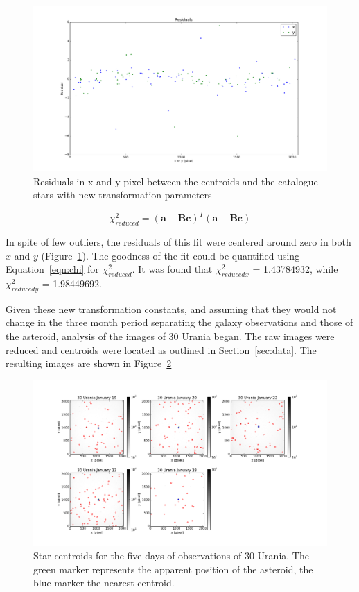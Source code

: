 \documentclass[a4paper,12pt]{article}
\begin{document}
\begin{figure}[!htbp]
\centering
\includegraphics[scale = 0.35]{fit_residuals.png}
\caption{Residuals in x and y pixel between the centroids and the catalogue stars with new transformation parameters}
\label{fig:residuals}
\end{figure}

\begin{equation}
\chi ^{2}_{reduced} = (\mathbf{a}-\mathbf{B}\mathbf{c})^{T}(\mathbf{a}-\mathbf{B}\mathbf{c})
\label{eqn:chi}
\end{equation}

In spite of few outliers, the residuals of this fit were centered around zero in both $x$ and $y$ (Figure~\ref{fig:residuals}). The goodness of the fit could be quantified using Equation~\ref{eqn:chi} for $\chi^{2}_{reduced}$. It was found that $\chi^{2}_{reducedx}$ = 1.43784932, while $\chi^{2}_{reducedy}$ = 1.98449692.

Given these new transformation constants, and assuming that they would not change in the three month period separating the galaxy observations and those of the asteroid, analysis of the images of 30 Urania began. The raw images were reduced and centroids were located as outlined in Section~\ref{sec:data}. The resulting images are shown in Figure~\ref{fig:urania}

\begin{figure}[!htbp]
\centering
\includegraphics[width = \linewidth]{urania_centroid_fix2.png}
\caption{Star centroids for the five days of observations of 30 Urania. The green marker represents the apparent position of the asteroid, the blue marker the nearest centroid.}
\label{fig:urania}
\end{figure}
\end{document}

